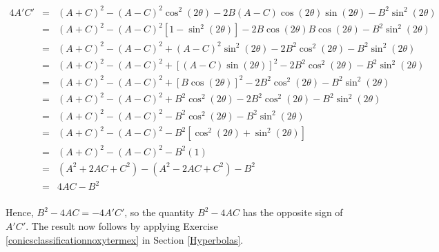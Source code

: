 \[ \begin{array}{rcl}

4A'C' & = & (A+C)^2 - (A-C)^2 \cos^{2}(2\theta) -2B(A-C)\cos(2\theta)\sin(2\theta) -B^2\sin^2(2\theta) \\ [3pt]
      & = & (A+C)^2 - (A-C)^2 \left[ 1-\sin^{2}(2\theta)\right] -2B\cos(2\theta) B \cos(2\theta) -B^2\sin^2(2\theta) \\ [3pt]
      & = & (A+C)^2 - (A-C)^2  + (A-C)^2 \sin^{2}(2\theta) -2B^2\cos^{2}(2\theta) -B^2\sin^2(2\theta) \\ [3pt]   
      & = & (A+C)^2 - (A-C)^2  +\left[(A-C) \sin(2\theta)\right]^2 -2B^2\cos^{2}(2\theta) -B^2\sin^2(2\theta)  \\ [3pt]    
      & = & (A+C)^2 - (A-C)^2  +\left[B \cos(2\theta)\right]^2 -2B^2\cos^{2}(2\theta) -B^2\sin^2(2\theta)  \\ [3pt]      
      & = & (A+C)^2 - (A-C)^2  +B^2\cos^{2}(2\theta) -2B^2\cos^{2}(2\theta) -B^2\sin^2(2\theta)  \\ [3pt]   
      & = & (A+C)^2 - (A-C)^2  -B^2\cos^{2}(2\theta) -B^2\sin^2(2\theta)  \\ [3pt] 
		  & = & (A+C)^2 - (A-C)^2  -B^2\left[\cos^{2}(2\theta)+ \sin^2(2\theta)\right]  \\ [3pt]  
		  & = & (A+C)^2 - (A-C)^2  -B^2 (1) \\ [3pt] 
	  	& = & \left(A^2 + 2AC+C^2\right) - \left(A^2 - 2AC+C^2\right)  -B^2  \\ [3pt] 			    			
	  	& = & 4AC  -B^2  \\ [3pt] 		
\end{array} \]

Hence, $B^2 - 4AC = -4 A'C'$, so the quantity $B^2 - 4AC$ has the opposite sign of $A'C'$.  The result now follows by applying  Exercise \ref{conicsclassificationnoxytermex} in Section \ref{Hyperbolas}.

